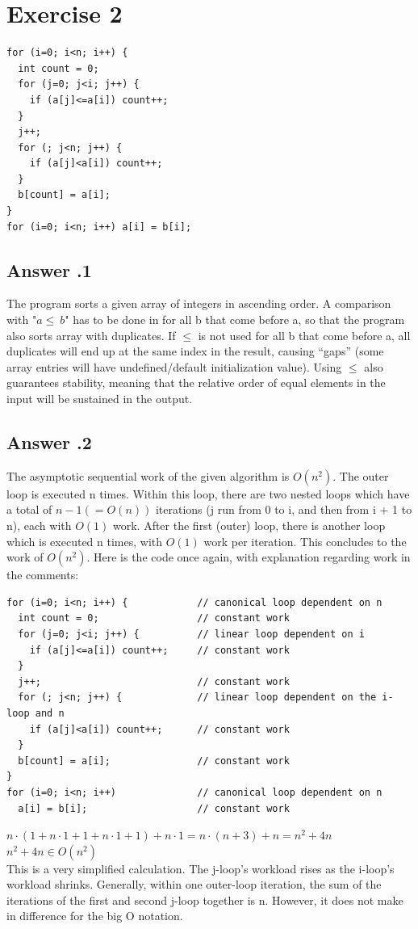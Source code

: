 \documentclass[a4paper,%
11pt,%
DIV=12,
headsepline,%
headings=normal,
]{scrartcl}
\newcounter{curex}
\newcommand{\exercise}[1]{\section*{Exercise #1}\setcounter{curex}{#1}}
\newcommand{\answer}[1]{\subsection*{Answer \arabic{curex}.#1}}
\begin{document}
\exercise{2}

\begin{lstlisting}
for (i=0; i<n; i++) {
  int count = 0;
  for (j=0; j<i; j++) {
    if (a[j]<=a[i]) count++;
  }
  j++;
  for (; j<n; j++) {
    if (a[j]<a[i]) count++;
  }
  b[count] = a[i];
}
for (i=0; i<n; i++) a[i] = b[i];
\end{lstlisting}

\answer{1}
The program sorts a given array of integers in ascending order. A comparison with "$a \leq \ b$" has to be done in for all b that come before a, so that the program also sorts array with duplicates. If $\leq$ is not used for all b that come before a, all duplicates will end up at the same index in the result, causing ``gaps'' (some array entries will have undefined/default initialization value). Using $\leq$ also guarantees stability, meaning that the relative order of equal elements in the input will be sustained in the output.

\answer{2}
The asymptotic sequential work of the given algorithm is $O(n^{2})$. The outer loop is executed n times. Within this loop, there are two nested loops which have a total of $n-1 (= O(n))$ iterations (j run from 0 to i, and then from i + 1 to n), each with $O(1)$ work. After the first (outer) loop, there is another loop which is executed n times, with $O(1)$ work per iteration. This concludes to the work of $O(n^{2})$. Here is the code once again, with explanation regarding work in the comments:

\begin{lstlisting}
for (i=0; i<n; i++) {            // canonical loop dependent on n
  int count = 0;                 // constant work
  for (j=0; j<i; j++) {          // linear loop dependent on i
    if (a[j]<=a[i]) count++;     // constant work
  }
  j++;                           // constant work
  for (; j<n; j++) {             // linear loop dependent on the i-loop and n
    if (a[j]<a[i]) count++;      // constant work
  }
  b[count] = a[i];               // constant work
}
for (i=0; i<n; i++)              // canonical loop dependent on n
  a[i] = b[i];                   // constant work
\end{lstlisting}
\noindent
\begin{math}n \cdot (1 + n \cdot 1 + 1 + n \cdot 1 + 1) + n \cdot 1 = n \cdot (n + 3) + n = n^2 + 4n\end{math}\\
\begin{math}n^2 + 4n \in O(n^2)\end{math}\\
This is a very simplified calculation. The j-loop's workload rises as the i-loop's workload shrinks. Generally, within one outer-loop iteration, the sum of the iterations of the first and second j-loop together is n. However, it does not make in difference for the big O notation.
\end{document}
